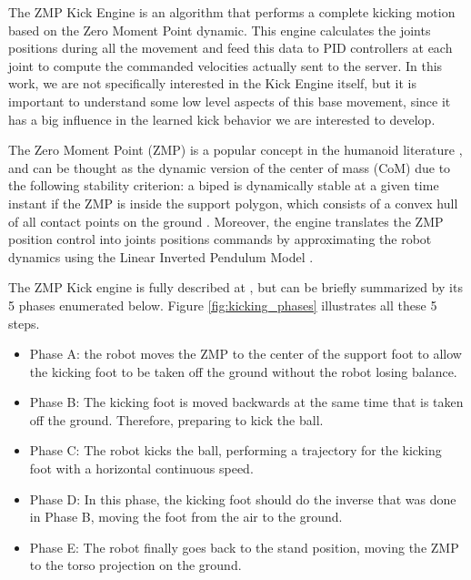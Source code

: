 The ZMP Kick Engine is an algorithm that performs a complete kicking motion based on the Zero Moment Point dynamic. This engine calculates the joints positions during all the movement and feed this data to PID controllers at each joint to compute the commanded velocities actually sent to the server. In this work, we are not specifically interested in the Kick Engine itself, but it is important to understand some low level aspects of this base movement, since it has a big influence in the learned kick behavior we are interested to develop.

The Zero Moment Point (ZMP) is a popular concept in the humanoid literature \cite{ZMP}, and can be thought as the dynamic version of the center of mass (CoM) due to the following stability criterion: a biped is dynamically stable at a given time instant if the ZMP is inside the support polygon, which consists of a convex hull of all contact points on the ground \cite{ZMP}. Moreover, the engine translates the ZMP position control into joints positions commands by approximating the robot dynamics using the Linear Inverted Pendulum  Model \cite{Kajita}.

The ZMP Kick engine is fully described at \cite{MestradoManga, CaminhadaManga}, but can be briefly summarized by its 5 phases enumerated below. Figure \ref{fig:kicking_phases} illustrates all these 5 steps.

\begin{itemize}
\item Phase A: the robot moves the ZMP to the center of the support foot to allow the kicking foot to be taken off the ground without the robot losing balance.

\item Phase B: The kicking foot is moved backwards at the same time that is taken off the ground. Therefore, preparing to kick the ball.

\item Phase C: The robot kicks the ball, performing a trajectory for the kicking foot with a horizontal continuous speed.

\item Phase D: In this phase, the kicking foot should do the inverse that was done in Phase B, moving the foot from the air to the ground.

\item Phase E: The robot finally goes back to the stand position, moving the ZMP to the torso projection on the ground.

\end{itemize}

